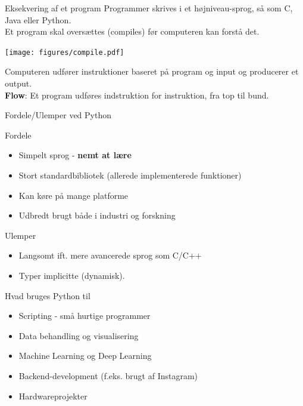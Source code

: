\documentclass[10pt]{beamer}
\begin{document}
\begin{frame}{Eksekvering af et program}
	Programmer skrives i et højniveau-sprog, så som C, Java eller Python.\\
	Et program skal oversættes (compiles) før computeren kan forstå det.\\

	\begin{center}
		\texttt{[image: figures/compile.pdf]}
	\end{center}

	Computeren udfører instruktioner baseret på program og input og producerer et output.\\
	\textbf{Flow}: Et program udføres indstruktion for instruktion, fra top til bund.
\end{frame}


\begin{frame}{Fordele/Ulemper ved Python}
      \begin{exampleblock}{Fordele}
		\begin{itemize}
			\item Simpelt sprog - \textbf{nemt at lære}
			\item Stort standardbibliotek (allerede implementerede funktioner)
			\item Kan køre på mange platforme
			\item Udbredt brugt både i industri og forskning
		\end{itemize}
      \end{exampleblock}

      \begin{alertblock}{Ulemper}
		\begin{itemize}
      \item Langsomt ift. mere avancerede sprog som C/C++
      \item Typer implicitte (dynamisk).
		\end{itemize}
      \end{alertblock}
\end{frame}

\begin{frame}{Hvad bruges Python til}
	\begin{itemize}
		\item Scripting - små hurtige programmer
		\item Data behandling og visualisering
		\item Machine Learning og Deep Learning
		\item Backend-development (f.eks. brugt af Instagram)
		\item Hardwareprojekter
	\end{itemize}
\end{frame}
\end{document}
